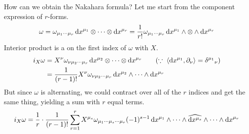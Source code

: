 \documentclass[a4paper, 10pt]{article}
\begin{document}
\begin{obs}
    How can we obtain the Nakahara formula? Let me start from the component expression of $r$-forms.
    \[ \omega = \omega_{\mu_{1}\cdots\mu_{r}} \, \mathrm{d}{x}^{\mu_{1}} \otimes \cdots \otimes \mathrm{d}{x}^{\mu_{r}} = \frac{1}{r!} \omega_{\mu_{1}\cdots\mu_{r}} \, \mathrm{d}{x}^{\mu_{1}} \wedge \otimes \wedge \mathrm{d}{x}^{\mu_{r}} \]
    Interior product is a  on the first index of $\omega$ with $X$.
    \begin{align*}
        i_{X}\omega &= X^{\nu}\omega_{\nu\mu_{2}\cdots\mu_{r}} \, \mathrm{d}{x}^{\mu_{2}} \otimes \cdots \otimes \mathrm{d}{x}^{\mu_{r}} \qquad (\because \; \left<\mathrm{d}{x}^{\mu_{1}}, \partial_{\nu} \right> = \delta^{\mu_{1}}{}_{\nu}) \\
        &= \frac{1}{(r-1)!} X^{\nu}\omega_{\nu\mu_{2}\cdots\mu_{r}} \, \mathrm{d}{x}^{\mu_{2}} \wedge \cdots \wedge \mathrm{d}{x}^{\mu_{r}}
    \end{align*}
    But since $\omega$ is alternating, we could contract over all of the $r$ indices and get the same thing, yielding a sum with $r$ equal terms.
    \[ i_{X}\omega = \frac{1}{r} \cdot \frac{1}{(r-1)!} \sum_{r=1}^{r} X^{\mu_{s}} \omega_{\mu_{1}\cdots\mu_{s}\cdots\mu_{r}} (-1)^{s-1} \, \mathrm{d}{x}^{\mu_{1}} \wedge \cdots \wedge \widehat{\mathrm{d}{x}^{\mu_{s}}} \wedge \cdots \wedge \mathrm{d}{x}^{\mu_{r}} \]
\end{obs}
\newpage

\end{document}

